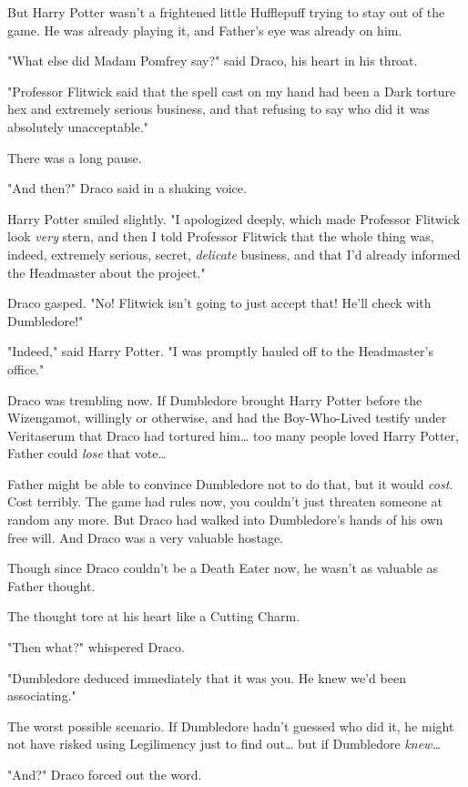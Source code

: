 But Harry Potter wasn't a frightened little Hufflepuff trying to stay out of 
the game. He was already playing it, and Father's eye was already on him.

"What else did Madam Pomfrey say?" said Draco, his heart in his throat.

"Professor Flitwick said that the spell cast on my hand had been a Dark torture 
hex and extremely serious business, and that refusing to say who did it was 
absolutely unacceptable."

There was a long pause.

"And then?" Draco said in a shaking voice.

Harry Potter smiled slightly. "I apologized deeply, which made Professor 
Flitwick look \emph{very} stern, and then I told Professor Flitwick that the 
whole thing was, indeed, extremely serious, secret, \emph{delicate} business, 
and that I'd already informed the Headmaster about the project."

Draco gasped. "No! Flitwick isn't going to just accept that! He'll check with 
Dumbledore!"

"Indeed," said Harry Potter. "I was promptly hauled off to the Headmaster's 
office."

Draco was trembling now. If Dumbledore brought Harry Potter before the 
Wizengamot, willingly or otherwise, and had the Boy-Who-Lived testify under 
Veritaserum that Draco had tortured him{\ldots} too many people loved Harry 
Potter, Father could \emph{lose} that vote{\ldots}

Father might be able to convince Dumbledore not to do that, but it would 
\emph{cost.} Cost terribly. The game had rules now, you couldn't just threaten 
someone at random any more. But Draco had walked into Dumbledore's hands of his 
own free will. And Draco was a very valuable hostage.

Though since Draco couldn't be a Death Eater now, he wasn't as valuable as 
Father thought.

The thought tore at his heart like a Cutting Charm.

"Then what?" whispered Draco.

"Dumbledore deduced immediately that it was you. He knew we'd been associating."

The worst possible scenario. If Dumbledore hadn't guessed who did it, he might 
not have risked using Legilimency just to find out{\ldots} but if Dumbledore 
\emph{knew{\ldots}}

"And?" Draco forced out the word.


